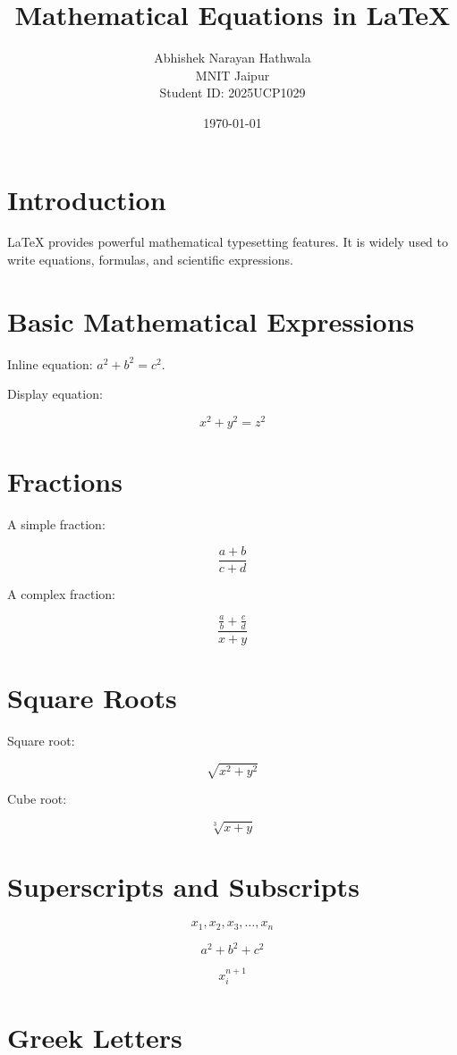 \documentclass[12pt,a4paper]{article}
\title{Mathematical Equations in LaTeX}
\author{Abhishek Narayan Hathwala \\ MNIT Jaipur \\ Student ID: 2025UCP1029}
\date{\today}
\begin{document}
\maketitle

\section{Introduction}

LaTeX provides powerful mathematical typesetting features.
It is widely used to write equations, formulas, and
scientific expressions.

\section{Basic Mathematical Expressions}

Inline equation: $a^2 + b^2 = c^2$.

Display equation:

\[
x^2 + y^2 = z^2
\]

\section{Fractions}

A simple fraction:

\[
\frac{a+b}{c+d}
\]

A complex fraction:

\[
\frac{\frac{a}{b}+\frac{c}{d}}{x+y}
\]

\section{Square Roots}

Square root:

\[
\sqrt{x^2+y^2}
\]

Cube root:

\[
\sqrt[3]{x+y}
\]

\section{Superscripts and Subscripts}

\[
x_1, x_2, x_3, \ldots, x_n
\]

\[
a^2+b^2+c^2
\]

\[
x_i^{n+1}
\]

\section{Greek Letters}
\end{document}
